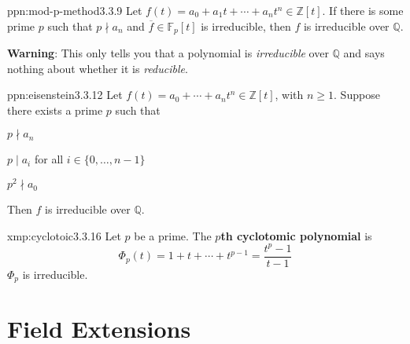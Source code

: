 \documentclass[landscape, 8pt]{extarticle}
\begin{document}
\begin{multicols}{3}
\begin{ppn}{ppn:mod-p-method}{3.3.9}
    Let $f(t) = a_{0} + a_{1}t + \cdots + a_{n}t^{n}\in \mathbb{Z}[t]$. If there is some prime $p$ such that $p \nmid a_{n}$ and $\overline{f} \in \mathbb{F}_{p}[t]$ is irreducible, then $f$ is irreducible over $\mathbb{Q}$.

    \textbf{Warning}: This only tells you that a polynomial is \textit{irreducible} over $\mathbb{Q}$ and says nothing about whether it is \textit{reducible}.
\end{ppn}

\begin{ppn}{ppn:eisenstein}{3.3.12}
    Let $f(t) = a_{0}+\cdots + a_{n}t^{n}\in \mathbb{Z}[t]$, with $n \ge 1$. Suppose there exists a prime $p$ such that
    \begin{itemize-tight}
        \item $p\nmid a_{n}$
        \item $p \mid a_{i}$ for all $i\in \{0,\dots, n - 1\}$
        \item $p^{2} \nmid a_{0}$
    \end{itemize-tight}
    Then $f$ is irreducible over $\mathbb{Q}$.
\end{ppn}


\begin{xmp}{xmp:cyclotoic}{3.3.16}
    Let $p$ be a prime. The \textbf{$p$th cyclotomic polynomial} is
    \[\Phi_{p}(t) = 1 + t + \cdots + t^{p-1} = \frac{t^{p} - 1}{t - 1}\]
    $\Phi_{p}$ is irreducible.
\end{xmp}

\section{Field Extensions}



\lipsum[1-12]
\end{multicols}
\end{document}

